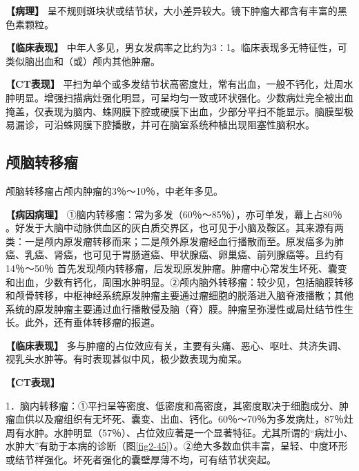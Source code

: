 \textbf{【病理】}
呈不规则斑块状或结节状，大小差异较大。镜下肿瘤大都含有丰富的黑色素颗粒。

\textbf{【临床表现】}
中年人多见，男女发病率之比约为3∶1。临床表现多无特征性，可类似脑出血和（或）颅内其他肿瘤。

\textbf{【CT表现】}
平扫为单个或多发结节状高密度灶，常有出血，一般不钙化，灶周水肿明显。增强扫描病灶强化明显，可呈均匀一致或环状强化。少数病灶完全被出血掩盖，仅表现为脑内、蛛网膜下腔或硬膜下出血，少部分平扫不能显示。脑膜型极易漏诊，可沿蛛网膜下腔播散，并可在脑室系统种植出现阻塞性脑积水。

\subsection{颅脑转移瘤}

颅脑转移瘤占颅内肿瘤的3％～10％，中老年多见。

\textbf{【病因病理】}
①脑内转移瘤：常为多发（60％～85％），亦可单发，幕上占80％
。好发于大脑中动脉供血区的灰白质交界区，也可见于小脑及鞍区。其来源有两类：一是颅内原发瘤转移而来；二是颅外原发瘤经血行播散而至。原发癌多为肺癌、乳癌、肾癌，也可见于胃肠道癌、甲状腺癌、卵巢癌、前列腺癌等。且约有14％～50％
首先发现颅内转移瘤，后发现原发肿瘤。肿瘤中心常发生坏死、囊变和出血，少数有钙化，周围水肿明显。②颅内脑外转移瘤：较少见，包括脑膜转移和颅骨转移，中枢神经系统原发肿瘤主要通过瘤细胞的脱落进入脑脊液播散；其他系统的原发肿瘤主要通过血行播散侵及脑（脊）膜。肿瘤呈弥漫性或局灶结节性生长。此外，还有垂体转移瘤的报道。

\textbf{【临床表现】}
多与肿瘤的占位效应有关，主要有头痛、恶心、呕吐、共济失调、视乳头水肿等。有时表现甚似中风，极少数表现为痴呆。

\textbf{【CT表现】}

1．脑内转移瘤：①平扫呈等密度、低密度和高密度，其密度取决于细胞成分、肿瘤血供以及瘤组织有无坏死、囊变、出血、钙化。60％～70％为多发病灶，87％灶周有水肿。水肿明显（57％）、占位效应著是一个显著特征。尤其所谓的“病灶小、水肿大”有助于本病的诊断（图\ref{fig2-45}）。②绝大多数血供丰富，呈轻、中度环形或结节样强化。坏死者强化的囊壁厚薄不均，可有结节状突起。

